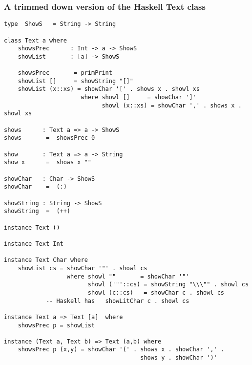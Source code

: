 \subsubsection*{A trimmed down version of the Haskell Text class}
\begin{verbatim}
type  ShowS   = String -> String

class Text a where 
    showsPrec      : Int -> a -> ShowS
    showList       : [a] -> ShowS

    showsPrec       = primPrint
    showList []     = showString "[]"
    showList (x::xs) = showChar '[' . shows x . showl xs
                      where showl []     = showChar ']'
                            showl (x::xs) = showChar ',' . shows x . showl xs

shows      : Text a => a -> ShowS
shows       =  showsPrec 0

show       : Text a => a -> String
show x      =  shows x ""

showChar   : Char -> ShowS
showChar    =  (:)

showString : String -> ShowS
showString  =  (++)

instance Text ()

instance Text Int

instance Text Char where
    showList cs = showChar '"' . showl cs
                  where showl ""       = showChar '"'
                        showl ('"'::cs) = showString "\\\"" . showl cs
                        showl (c::cs)   = showChar c . showl cs
			-- Haskell has   showLitChar c . showl cs

instance Text a => Text [a]  where
    showsPrec p = showList

instance (Text a, Text b) => Text (a,b) where
    showsPrec p (x,y) = showChar '(' . shows x . showChar ',' .
                                       shows y . showChar ')'
\end{verbatim}

